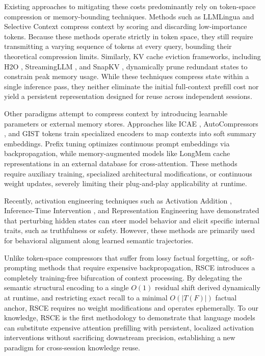 \documentclass[11pt]{article}
\begin{document}
Existing approaches to mitigating these costs predominantly rely on token-space compression or memory-bounding techniques. Methods such as LLMLingua \cite{jiang2023llmlingua} and Selective Context \cite{li2023compressing} compress context by scoring and discarding low-importance tokens. Because these methods operate strictly in token space, they still require transmitting a varying sequence of tokens at every query, bounding their theoretical compression limits. Similarly, KV cache eviction frameworks, including H2O \cite{zhang2023h2o}, StreamingLLM \cite{xiao2023streamingllm}, and SnapKV \cite{li2024snapkv}, dynamically prune redundant states to constrain peak memory usage. While these techniques compress state within a single inference pass, they neither eliminate the initial full-context prefill cost nor yield a persistent representation designed for reuse across independent sessions.

Other paradigms attempt to compress context by introducing learnable parameters or external memory stores. Approaches like ICAE \cite{ge2023icae}, AutoCompressors \cite{chevalier2023autocompressors}, and GIST tokens \cite{mu2023learning} train specialized encoders to map contexts into soft summary embeddings. Prefix tuning \cite{li2021prefix} optimizes continuous prompt embeddings via backpropagation, while memory-augmented models like LongMem \cite{wang2023longmem} cache representations in an external database for cross-attention. These methods require auxiliary training, specialized architectural modifications, or continuous weight updates, severely limiting their plug-and-play applicability at runtime.

Recently, activation engineering techniques such as Activation Addition \cite{turner2023activation}, Inference-Time Intervention \cite{li2023inference}, and Representation Engineering \cite{zou2023representation} have demonstrated that perturbing hidden states can steer model behavior and elicit specific internal traits, such as truthfulness or safety. However, these methods are primarily used for behavioral alignment along learned semantic trajectories.

Unlike token-space compressors that suffer from lossy factual forgetting, or soft-prompting methods that require expensive backpropagation, RSCE introduces a completely training-free bifurcation of context processing. By delegating the semantic structural encoding to a single $O(1)$ residual shift derived dynamically at runtime, and restricting exact recall to a minimal $O(|T(F)|)$ factual anchor, RSCE requires no weight modifications and operates ephemerally. To our knowledge, RSCE is the first methodology to demonstrate that language models can substitute expensive attention prefilling with persistent, localized activation interventions without sacrificing downstream precision, establishing a new paradigm for cross-session knowledge reuse.
\end{document}
